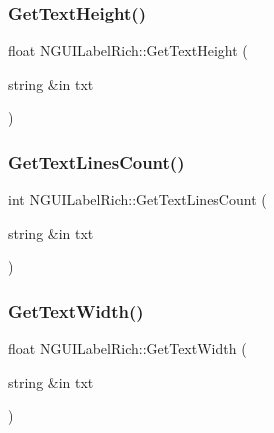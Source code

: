 \hypertarget{class_n_g_u_i_label_rich_aec81e673ec89b7050f8d73b6f0185c54}{}\label{class_n_g_u_i_label_rich_aec81e673ec89b7050f8d73b6f0185c54} 
\subsubsection{\texorpdfstring{Get\+Text\+Height()}{GetTextHeight()}}
{\footnotesize\ttfamily float N\+G\+U\+I\+Label\+Rich\+::\+Get\+Text\+Height (\begin{DoxyParamCaption}\item[{string \&in}]{txt }\end{DoxyParamCaption})}

\hypertarget{class_n_g_u_i_label_rich_a3698b06a05b2c47e0b4123dd7dd9eb42}{}\label{class_n_g_u_i_label_rich_a3698b06a05b2c47e0b4123dd7dd9eb42} 
\subsubsection{\texorpdfstring{Get\+Text\+Lines\+Count()}{GetTextLinesCount()}}
{\footnotesize\ttfamily int N\+G\+U\+I\+Label\+Rich\+::\+Get\+Text\+Lines\+Count (\begin{DoxyParamCaption}\item[{string \&in}]{txt }\end{DoxyParamCaption})}

\hypertarget{class_n_g_u_i_label_rich_a54b2126858fcb89e1fc4d99b1c89d1aa}{}\label{class_n_g_u_i_label_rich_a54b2126858fcb89e1fc4d99b1c89d1aa} 
\subsubsection{\texorpdfstring{Get\+Text\+Width()}{GetTextWidth()}}
{\footnotesize\ttfamily float N\+G\+U\+I\+Label\+Rich\+::\+Get\+Text\+Width (\begin{DoxyParamCaption}\item[{string \&in}]{txt }\end{DoxyParamCaption})}

